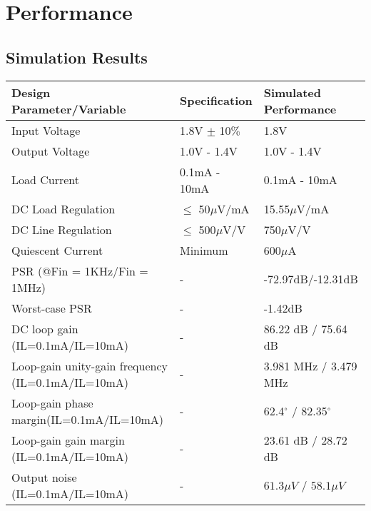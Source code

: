 \documentclass{report}
\begin{document}
    \chapter{Performance}

    \section{Simulation Results}
    \begin{center}
        \begin{tabular}{|m{25em}|m{7em}|m{12em}|}
            \hline
            \textbf{Design Parameter/Variable} & \textbf{Specification} & \textbf{Simulated Performance} \\
            \hline
            \hline
            Input Voltage & 1.8V $\pm$ 10$\%$ & 1.8V \\
            \hline
            Output Voltage & 1.0V - 1.4V  & 1.0V - 1.4V \\
            \hline
            Load Current & 0.1mA - 10mA & 0.1mA - 10mA \\
            \hline
            DC Load Regulation & $\leq$ 50$\mu$V/mA & 15.55$\mu$V/mA\\
            \hline
            DC Line Regulation & $\leq$ 500$\mu$V/V & 750$\mu$V/V\\
            \hline
            Quiescent Current & Minimum & 600$\mu$A \\
            \hline
            PSR (@Fin = 1KHz/Fin = 1MHz) & - & -72.97dB/-12.31dB\\
            \hline
            Worst-case PSR & - & -1.42dB\\
            \hline
            DC loop gain (IL=0.1mA/IL=10mA) & - & 86.22 dB / 75.64 dB\\
            \hline
            Loop-gain unity-gain frequency (IL=0.1mA/IL=10mA) & - & 3.981 MHz / 3.479 MHz\\
            \hline
            Loop-gain phase margin(IL=0.1mA/IL=10mA) & - & 62.4$^{\circ}$ / 82.35$^{\circ}$  \\
            \hline
            Loop-gain gain margin (IL=0.1mA/IL=10mA) & - & 23.61 dB / 28.72 dB \\ 
            \hline
            Output noise (IL=0.1mA/IL=10mA) & - & $61.3\mu V$ / $58.1 \mu V$\\
            \hline

            \end{tabular}
    \end{center}
\end{document}
